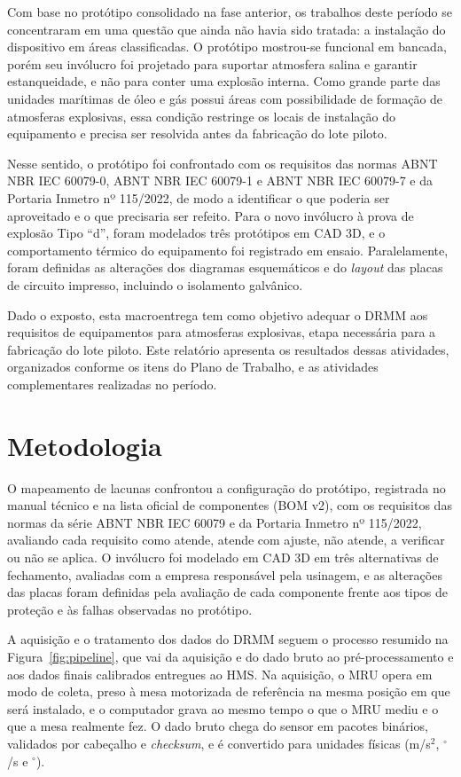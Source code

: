 \documentclass[a4paper, 12pt]{article}
\begin{document}
Com base no protótipo consolidado na fase anterior, os trabalhos deste período se concentraram em uma questão que ainda não havia sido tratada: a instalação do dispositivo em áreas classificadas. O protótipo mostrou-se funcional em bancada, porém seu invólucro foi projetado para suportar atmosfera salina e garantir estanqueidade, e não para conter uma explosão interna. Como grande parte das unidades marítimas de óleo e gás possui áreas com possibilidade de formação de atmosferas explosivas, essa condição restringe os locais de instalação do equipamento e precisa ser resolvida antes da fabricação do lote piloto.

Nesse sentido, o protótipo foi confrontado com os requisitos das normas ABNT NBR IEC 60079-0, ABNT NBR IEC 60079-1 e ABNT NBR IEC 60079-7 e da Portaria Inmetro nº 115/2022, de modo a identificar o que poderia ser aproveitado e o que precisaria ser refeito. Para o novo invólucro à prova de explosão Tipo ``d'', foram modelados três protótipos em CAD 3D, e o comportamento térmico do equipamento foi registrado em ensaio. Paralelamente, foram definidas as alterações dos diagramas esquemáticos e do \textit{layout} das placas de circuito impresso, incluindo o isolamento galvânico.

Dado o exposto, esta macroentrega tem como objetivo adequar o DRMM aos requisitos de equipamentos para atmosferas explosivas, etapa necessária para a fabricação do lote piloto. Este relatório apresenta os resultados dessas atividades, organizados conforme os itens do Plano de Trabalho, e as atividades complementares realizadas no período.

\newpage
\section{Metodologia}\label{sec:metodologia}

O mapeamento de lacunas confrontou a configuração do protótipo, registrada no manual técnico e na lista oficial de componentes (BOM v2), com os requisitos das normas da série ABNT NBR IEC 60079 e da Portaria Inmetro nº 115/2022, avaliando cada requisito como atende, atende com ajuste, não atende, a verificar ou não se aplica. O invólucro foi modelado em CAD 3D em três alternativas de fechamento, avaliadas com a empresa responsável pela usinagem, e as alterações das placas foram definidas pela avaliação de cada componente frente aos tipos de proteção e às falhas observadas no protótipo.

A aquisição e o tratamento dos dados do DRMM seguem o processo resumido na Figura~\ref{fig:pipeline}, que vai da aquisição e do dado bruto ao pré-processamento e aos dados finais calibrados entregues ao HMS. Na aquisição, o MRU opera em modo de coleta, preso à mesa motorizada de referência na mesma posição em que será instalado, e o computador grava ao mesmo tempo o que o MRU mediu e o que a mesa realmente fez. O dado bruto chega do sensor em pacotes binários, validados por cabeçalho e \textit{checksum}, e é convertido para unidades físicas (m/s$^2$, $^\circ$/s e $^\circ$).
\end{document}
